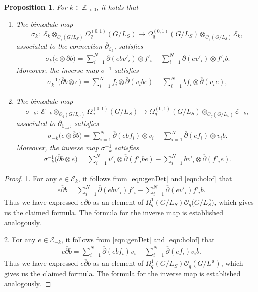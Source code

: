 \documentclass[10pt,a4paper]{amsart}
\numberwithin{equation}{section}
\newtheorem{prop}[Theorem]{Proposition}
 { \theoremstyle{definition}
\newtheorem{defn}[Theorem]{Definition}
\newtheorem{Note}[Theorem]{Note}
\newtheorem{eg}[Theorem]{Example}
\newtheorem{Remark}[Theorem]{Remark} }
\newcommand\adel{\overline{\partial}}
\begin{document}
\begin{prop}
For $k \in \mathbb{Z}_{> 0}$, it holds that
\begin{enumerate}\itemsep=0pt
\item[$1.$] The bimodule map
\[
\sigma_k\colon \ \mathcal{E}_k \otimes_{\mathcal{O}_q(G/L_S)} \Omega^{(0,1)}_q(G/L_S) \to \Omega^{(0,1)}_q(G/L_S) \otimes_{\mathcal{O}_q(G/L_S)} \mathcal{E}_{k},
\]
associated to the connection $\adel_{\mathcal{E}_{k}}$, satisfies
\begin{gather*}
\sigma_k\big(e \otimes \adel b\big) = \sum_{i=1}^{N} \adel(ebv'_i) \otimes f'_i - \sum_{i=1}^{N} \adel(ev'_i) \otimes f'_ib.
\end{gather*}
Moreover, the inverse map $\sigma^{-1}$ satisfies
\begin{gather*}
\sigma^{-1}_k\big(\adel b \otimes e\big) = \sum_{i=1}^N f_i \otimes \adel(v_ibe) - \sum_{i=1}^N bf_i \otimes \adel(v_ie),
\end{gather*}

\item[$2.$] The bimodule map
\[
\sigma_{-k}\colon \ \mathcal{E}_{-k} \otimes_{\mathcal{O}_q(G/L_S)} \Omega^{(0,1)}_q(G/L_S) \to \Omega^{(0,1)}_q(G/L_S) \otimes_{\mathcal{O}_q(G/L_S)} \mathcal{E}_{-k},
\]
associated to $\adel_{\mathcal{E}_{-k}}$, satisfies
\begin{gather*}
\sigma_{-k}\big(e \otimes \adel b\big) = \sum_{i=1}^{N} \adel(ebf_i) \otimes v_i - \sum_{i=1}^{N} \adel(ef_i) \otimes v_ib.
\end{gather*}
Moreover, the inverse map $\sigma^{-1}_{-k}$ satisfies
\begin{gather*}
\sigma^{-1}_{-k}\big(\adel b \otimes e\big) = \sum_{i=1}^N v'_i \otimes \adel(f'_ibe) - \sum_{i=1}^N bv'_i \otimes \adel(f'_ie).
\end{gather*}
\end{enumerate}
\end{prop}
\begin{proof}
1. For any $e \in \mathcal{E}_k$, it follows from \eqref{eqn:genDet} and \eqref{eqn:holof} that
\begin{gather*}
e\adel b =
\sum_{i=1}^{N} \adel(ebv'_i)f'_i - \sum_{i=1}^{N} \adel(ev'_i)f'_ib.
\end{gather*}
Thus we have expressed $e\adel b$ as an element of $\Omega^1_q(G/L_S)\mathcal{O}_q\big(G/L^{\,\mathrm{s}}_S\big)$, which gives us the claimed formula. The formula for the inverse map is established analogously.

2. For any $e \in \mathcal{E}_{-k}$, it follows from \eqref{eqn:genDet} and \eqref{eqn:holof} that
\begin{gather*}
e\adel b
= \sum_{i=1}^{N} \adel(ebf_i)v_i - \sum_{i=1}^{N} \adel(ef_i)v_ib.
\end{gather*}
Thus we have expressed $e\adel b$ as an element of $\Omega^1_q(G/L_S)\mathcal{O}_q(G/L^{\,\mathrm{s}})$, which gives us the claimed formula. The formula for the inverse map is established analogously.
\end{proof}
\end{document}
